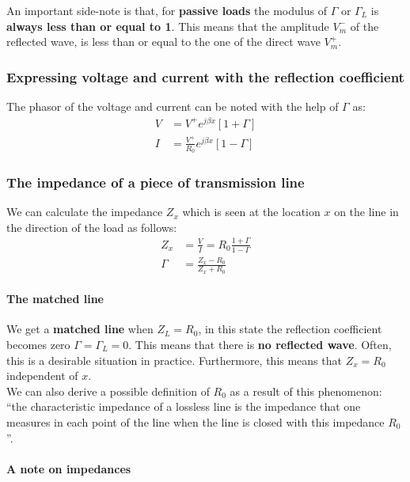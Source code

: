 \documentclass[../transmission.tex]{subfiles}
\begin{document}
				An important side-note is that, for \textbf{passive loads} the modulus of $\Gamma$ or $\Gamma_L$ is \textbf{always less than or equal to 1}. This means that the amplitude $V_m^-$ of the reflected wave, is less than or equal to the one of the direct wave $V_m^+$.
				
			\subsubsection{Expressing voltage and current with the reflection coefficient}
				The phasor of the voltage and current can be noted with the help of $\Gamma$ as:
				\begin{align}
					V&=V^+e^{j\beta x}[1+\Gamma]\\
					I&=\frac{V^+}{R_0}e^{j\beta x}[1-\Gamma]
				\end{align}
			
			\subsubsection{The impedance of a piece of transmission line}
				We can calculate the impedance $Z_x$ which is seen at the location $x$ on the line in the direction of the load as follows:
				\begin{align}
					Z_x &= \frac{V}{I} = R_0\frac{1+\Gamma}{1-\Gamma}\\
					\Gamma&=\frac{Z_x-R_0}{Z_x+R_0}
				\end{align}
				
				\paragraph{The matched line}
					We get a \textbf{matched line} when $Z_L = R_0$, in this state the reflection coefficient becomes zero $\Gamma = \Gamma_L=0$. This means that there is \textbf{no reflected wave}. Often, this is a desirable situation in practice. Furthermore, this means that $Z_x = R_0$ independent of $x$.\\
					
					We can also derive a possible definition of $R_0$ as a result of this phenomenon: ``the characteristic impedance of a lossless line is the impedance that one measures in each point of the line when the line is closed with this impedance $R_0$''.
				
				\paragraph{A note on impedances}
					
				
\end{document}
